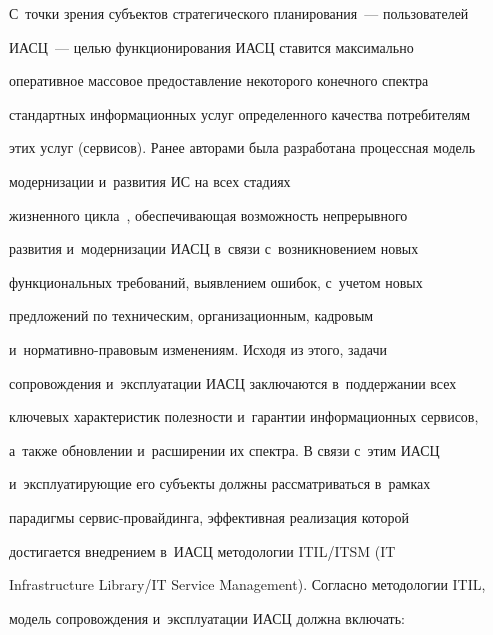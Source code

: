 С~точки зрения субъектов стратегического планирования~--- пользователей 


ИАСЦ~--- целью функционирования ИАСЦ ставится максимально 


оперативное массовое предоставление некоторого конечного спектра 


стандартных информационных услуг определенного качества потребителям 


этих услуг (сервисов). Ранее авторами была разработана процессная модель 


модернизации и~развития ИС на всех стадиях 


жизненного цикла~\cite{9-bs}, обеспечивающая возможность непрерывного 


развития и~модернизации ИАСЦ в~связи с~возникновением новых 


функциональных требований, выявлением ошибок, с~учетом новых 


предложений по техническим, организационным, кадровым  


и~нормативно-правовым изменениям. Исходя из этого, задачи 


сопровождения и~эксплуатации ИАСЦ заключаются в~поддержании всех 


ключевых характеристик полезности и~гарантии информационных сервисов, 


а~также обнов\-ле\-нии и~расширении их спектра. В связи с~этим ИАСЦ 


и~эксплуатирующие его субъекты должны рассматриваться в~рамках 


парадигмы сер\-вис-про\-вай\-дин\-га, эффективная реализация которой 


достигается внедрением в~ИАСЦ методологии ITIL\!/\!ITSM (IT 


Infrastructure Library/\!IT Service Management). Согласно методологии ITIL, 


модель сопровождения и~эксплуатации ИАСЦ должна включать:


{





}





\noindent


